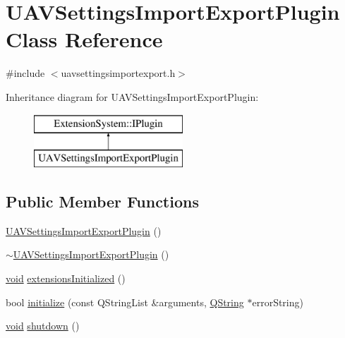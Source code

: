 \hypertarget{class_u_a_v_settings_import_export_plugin}{\section{\-U\-A\-V\-Settings\-Import\-Export\-Plugin \-Class \-Reference}
\label{class_u_a_v_settings_import_export_plugin}
}


{\ttfamily \#include $<$uavsettingsimportexport.\-h$>$}

\-Inheritance diagram for \-U\-A\-V\-Settings\-Import\-Export\-Plugin\-:\begin{figure}[H]
\begin{center}
\leavevmode
\includegraphics[height=2.000000cm]{class_u_a_v_settings_import_export_plugin}
\end{center}
\end{figure}
\subsection*{\-Public \-Member \-Functions}
\begin{DoxyCompactItemize}
\item 
\hyperlink{group___u_a_v_settings_import_export_gad19bf02649bc86e8245c1ad401db02b7}{\-U\-A\-V\-Settings\-Import\-Export\-Plugin} ()
\item 
\hyperlink{group___u_a_v_settings_import_export_ga14bcad14e65bb435b384bc26e367f553}{$\sim$\-U\-A\-V\-Settings\-Import\-Export\-Plugin} ()
\item 
\hyperlink{group___u_a_v_objects_plugin_ga444cf2ff3f0ecbe028adce838d373f5c}{void} \hyperlink{group___u_a_v_settings_import_export_ga8cbd9cce7f1b58c44d6dfdef36b50f81}{extensions\-Initialized} ()
\item 
bool \hyperlink{group___u_a_v_settings_import_export_ga78fbb80d8d70b2e76652a80594215faf}{initialize} (const \-Q\-String\-List \&arguments, \hyperlink{group___u_a_v_objects_plugin_gab9d252f49c333c94a72f97ce3105a32d}{\-Q\-String} $\ast$error\-String)
\item 
\hyperlink{group___u_a_v_objects_plugin_ga444cf2ff3f0ecbe028adce838d373f5c}{void} \hyperlink{group___u_a_v_settings_import_export_ga5e2dd335427148df64c9b2b3b9a16e8d}{shutdown} ()
\end{DoxyCompactItemize}


